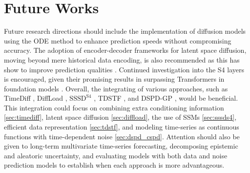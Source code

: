 \section{Future Works} \label{sec:future_works}
Future research directions should include the implementation of diffusion models using the ODE method to enhance prediction speeds without compromising accuracy. The adoption of encoder-decoder frameworks for latent space diffusion, moving beyond mere historical data encoding, is also recommended as this has show to improve prediction qualities \cite{rombach_high-resolution_2022}. Continued investigation into the S4 layers \cite{goel_its_2022} is encouraged, given their promising results in surpassing Transformers in foundation models \cite{gu_mamba_2023}. Overall, the integrating of various approaches, such as TimeDiff \cite{shen_non-autoregressive_2023}, DiffLoad \cite{wang_diffload_2023}, $\text{SSSD}^{\text{S4}}$ \cite{alcaraz_diffusion-based_2023}, TDSTF \cite{chang_tdstf_2023}, and DSPD-GP \cite{bilos_modeling_2022}, would be beneficial. This integration could focus on combining extra conditioning information \ref{sec:timediff}, latent space diffusion \ref{sec:diffload}, the use of SSMs \ref{sec:sssds4}, efficient data representation \ref{sec:tdstf}, and modeling time-series as continuous functions with time-dependent noise \ref{sec:dspd_cspd}. Attention should also be given to long-term multivariate time-series forecasting, decomposing epistemic and aleatoric uncertainty, and evaluating models with both data and noise prediction models to establish when each approach is more advantageous.